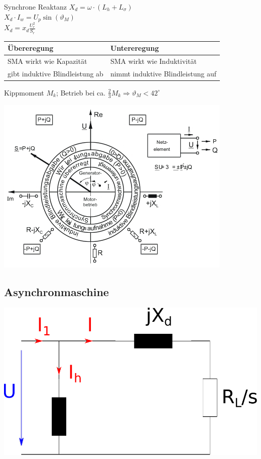 \documentclass[fs, footer]{latex4ei}
\begin{document}
\begin{multicols}{4}
		Synchrone Reaktanz $X_d = \omega \cdot (L_h + L_\sigma)$\\
		$X_d \cdot I_w = U_p \sin(\vartheta_M)$\\
		$X_d = x_d \frac{U_r^2}{S_r}$ \\
		\begin{tabular}{ll}
			Übereregung & Untereregung\\ \midrule
			SMA wirkt wie Kapazität & SMA wirkt wie Induktivität\\
			gibt induktive Blindleistung ab & nimmt induktive Blindleistung auf\\
		\end{tabular}
		
		Kippmoment $M_k$; Betrieb bei ca. $\frac{2}{3} M_k \Rightarrow \vartheta_M < 42^\circ$\\
		
		\begin{center}
		\includegraphics[scale=.6]{./img/synchronmaschine_betriebsbereiche.jpg}
		\end{center}
		
		\subsection{Asynchronmaschine}
		
		\begin{center}
		\includegraphics[scale=.2]{./img/ersatzschaltbild_asynchronmaschine.pdf}
		\end{center}
		 

\end{multicols}
\end{document}
